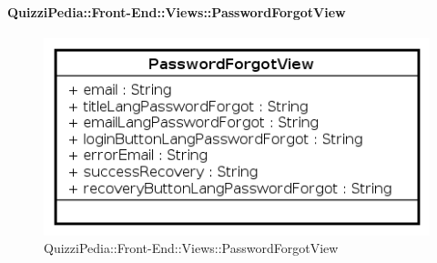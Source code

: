 \paragraph{QuizziPedia::Front-End::Views::PasswordForgotView}

\label{QuizziPedia::Front-End::View::PasswordForgotView}
\begin{figure} [ht]
	\centering
	\includegraphics[scale=0.80]{UML/Classi/Front-End/QuizziPedia_Front-end_Views_PasswordForgotView.png}
	\caption{QuizziPedia::Front-End::Views::PasswordForgotView}
\end{figure} \FloatBarrier
